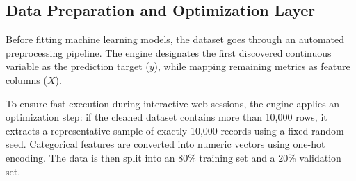 \documentclass[11pt,a4paper,titlepage]{article}
\begin{document}
\subsection{Data Preparation and Optimization Layer}
Before fitting machine learning models, the dataset goes through an automated preprocessing pipeline. The engine designates the first discovered continuous variable as the prediction target ($y$), while mapping remaining metrics as feature columns ($X$). 

To ensure fast execution during interactive web sessions, the engine applies an optimization step: if the cleaned dataset contains more than 10,000 rows, it extracts a representative sample of exactly 10,000 records using a fixed random seed. Categorical features are converted into numeric vectors using one-hot encoding. The data is then split into an 80\% training set and a 20\% validation set.
\end{document}
